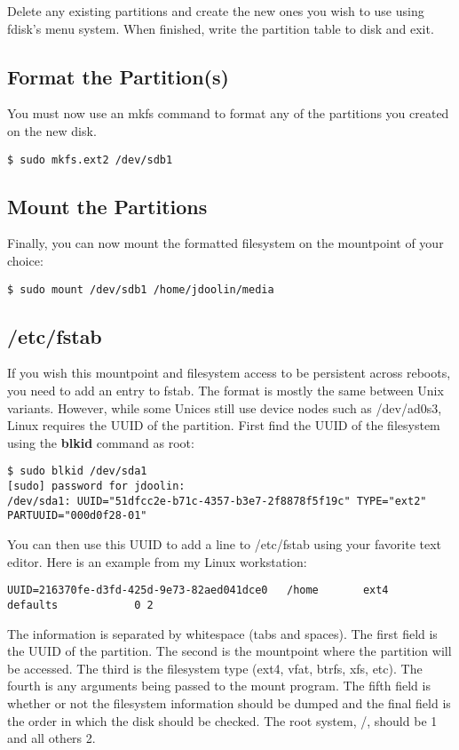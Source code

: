 Delete any existing partitions and create the new ones you wish to use using fdisk's menu system.  When finished, write the partition table to disk and exit.

\subsection{Format the Partition(s)}

You must now use an mkfs command to format any of the partitions you created on the new disk.

\begin{verbatim}
$ sudo mkfs.ext2 /dev/sdb1
\end{verbatim}

\subsection{Mount the Partitions}

Finally, you can now mount the formatted filesystem on the mountpoint of your choice:

\begin{verbatim}
$ sudo mount /dev/sdb1 /home/jdoolin/media
\end{verbatim}

\subsection{/etc/fstab}

If you wish this mountpoint and filesystem access to be persistent across reboots, you need to add an entry to fstab.  The format is mostly the same between Unix variants.  However, while some Unices still use device nodes such as /dev/ad0s3, Linux requires the UUID of the partition.  First find the UUID of the filesystem using the \textbf{blkid} command as root:

\begin{verbatim}
$ sudo blkid /dev/sda1
[sudo] password for jdoolin:
/dev/sda1: UUID="51dfcc2e-b71c-4357-b3e7-2f8878f5f19c" TYPE="ext2" PARTUUID="000d0f28-01"
\end{verbatim}

You can then use this UUID to add a line to /etc/fstab using your favorite text editor.  Here is an example from my Linux workstation:

\begin{verbatim}
UUID=216370fe-d3fd-425d-9e73-82aed041dce0 	/home		ext4 		defaults			0 2
\end{verbatim}

The information is separated by whitespace (tabs and spaces).  The first field is the UUID of the partition.  The second is the mountpoint where the partition will be accessed.  The third is the filesystem type (ext4, vfat, btrfs, xfs, etc).  The fourth is any arguments being passed to the mount program.  The fifth field is whether or not the filesystem information should be dumped and the final field is the order in which the disk should be checked.  The root system, /, should be 1 and all others 2.
